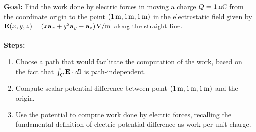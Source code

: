 \documentclass[../../header.tex]{subfiles}
\begin{document}
\textbf{Goal:} Find the work done by electric forces in moving a charge $Q = 1\,\text{nC}$ from the coordinate origin to the point $(1\,\text{m},1\,\text{m},1\,\text{m})$ in the electrostatic field given by $\mathbf{E}(x,y,z) = (x \mathbf{a}_x  + y^2 \mathbf{a}_y - \mathbf{a}_z)\, \text{V/m}$ along the straight line.\\
\\
\textbf{Steps:} 
\begin{enumerate}
\item Choose a path that would facilitate the computation of the work, based on the fact that 
$\int_C \mathbf{E} \cdot d\mathbf{l}$ is path-independent. 


\item Compute scalar potential difference between point $(1\,\text{m},1\,\text{m},1\,\text{m})$ and the origin.


\item Use the potential to compute work done by electric forces, recalling the fundamental definition 
of electric potential difference as work per unit charge. 


\end{enumerate}
\end{document}
